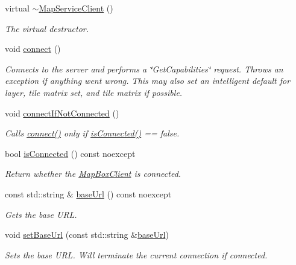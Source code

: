 \begin{DoxyCompactItemize}
\item 
virtual \hyperlink{group___imagery_module_ga93933812a2678d47a119231a41b52e2d}{$\sim$\+Map\+Service\+Client} ()
\begin{DoxyCompactList}\small\item\em The virtual destructor. \end{DoxyCompactList}\item 
void \hyperlink{group___imagery_module_ga5e5f58c725cafba7966936f688a6ade0}{connect} ()
\begin{DoxyCompactList}\small\item\em Connects to the server and performs a \char`\"{}\+Get\+Capabilities\char`\"{} request. Throws an exception if anything went wrong. This may also set an intelligent default for layer, tile matrix set, and tile matrix if possible. \end{DoxyCompactList}\item 
void \hyperlink{group___imagery_module_gafbcd14e6930fee4427877f52e36613ba}{connect\+If\+Not\+Connected} ()
\begin{DoxyCompactList}\small\item\em Calls \hyperlink{group___imagery_module_ga5e5f58c725cafba7966936f688a6ade0}{connect()} only if \hyperlink{group___imagery_module_gab0c42dc6fd8965108c0bc5ef80d4d4b3}{is\+Connected()} == false. \end{DoxyCompactList}\item 
bool \hyperlink{group___imagery_module_gab0c42dc6fd8965108c0bc5ef80d4d4b3}{is\+Connected} () const noexcept
\begin{DoxyCompactList}\small\item\em Return whether the \hyperlink{classdg_1_1deepcore_1_1imagery_1_1_map_box_client}{Map\+Box\+Client} is connected. \end{DoxyCompactList}\item 
const std\+::string \& \hyperlink{group___imagery_module_gadf279770cec6dc9ac56348bb2e1b29e1}{base\+Url} () const noexcept
\begin{DoxyCompactList}\small\item\em Gets the base U\+RL. \end{DoxyCompactList}\item 
void \hyperlink{group___imagery_module_ga39b179cd4494f868a7807f616e04ee24}{set\+Base\+Url} (const std\+::string \&\hyperlink{group___imagery_module_gadf279770cec6dc9ac56348bb2e1b29e1}{base\+Url})
\begin{DoxyCompactList}\small\item\em Sets the base U\+RL. Will terminate the current connection if connected. \end{DoxyCompactList}\item 

\end{DoxyCompactItemize}

